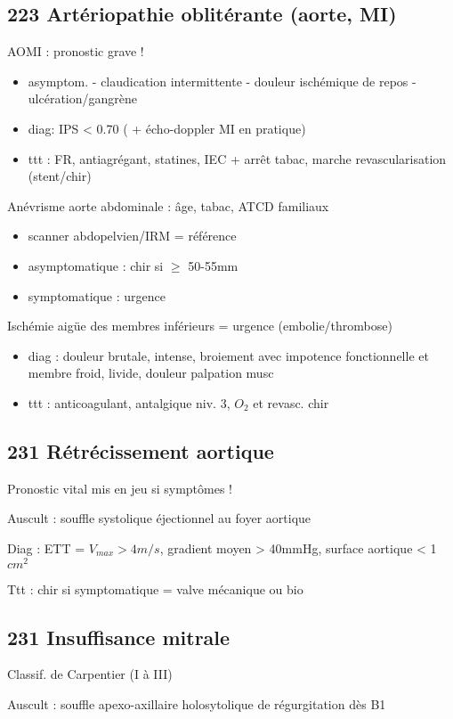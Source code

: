 \documentclass[11pt]{article}
\begin{document}
\subsection{223 Artériopathie oblitérante (aorte, MI)}
\label{sec:org4946473}
AOMI : pronostic grave !
\begin{itemize}
\item asymptom. - claudication intermittente - douleur ischémique de repos -
ulcération/gangrène
\item diag: IPS < 0.70 ( + écho-doppler MI en pratique)
\item ttt : FR, antiagrégant, statines, IEC + arrêt tabac, marche \textpm{}
revascularisation (stent/chir)
\end{itemize}
Anévrisme aorte abdominale : âge, tabac, ATCD familiaux
\begin{itemize}
\item scanner abdopelvien/IRM = référence
\item asymptomatique : chir si \diameter \(\ge\) 50-55mm
\item symptomatique : urgence \faBomb
\end{itemize}
Ischémie aigüe des membres inférieurs = urgence \faBomb (embolie/thrombose)
\begin{itemize}
\item diag : douleur brutale, intense, broiement avec impotence fonctionnelle et membre froid, livide, douleur palpation musc
\item ttt : anticoagulant, antalgique niv. 3, \(O_2\) et revasc. chir
\end{itemize}

\subsection{231 Rétrécissement aortique}
\label{sec:orgfdc946d}
Pronostic vital mis en jeu si symptômes !

Auscult : souffle systolique éjectionnel au foyer aortique

Diag : ETT = \(V_{max} > 4m/s\), gradient moyen > 40mmHg, surface aortique <
1\(cm^2\)

Ttt : chir si symptomatique = valve mécanique ou bio
\subsection{231 Insuffisance mitrale}
\label{sec:org76c8d1a}
Classif. de Carpentier (I à III)

Auscult : souffle apexo-axillaire holosytolique de régurgitation dès B1
\end{document}
